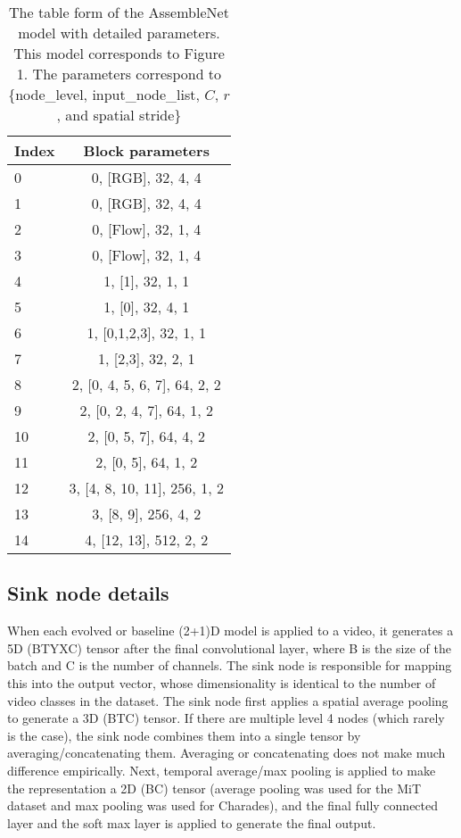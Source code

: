 \documentclass{article} \usepackage{iclr2020_conference,times}
\begin{document}
\begin{table}
    \centering
    \setlength\tabcolsep{5pt}
    \caption{The table form of the AssembleNet model with detailed parameters. This model corresponds to Figure 1. The parameters correspond to \{node\_level, input\_node\_list, $C$, $r$, and spatial stride\}}
    \label{tab:model}
    \begin{tabular}{|l|c|}
    \hline
      Index & Block parameters\\
    \hline
    0 & 0, [RGB], 32, 4, 4 \\ \hline
    1 & 0, [RGB], 32, 4, 4 \\ \hline
    2 & 0, [Flow], 32, 1, 4 \\ \hline
    3 & 0, [Flow], 32, 1, 4 \\ \hline
    4 & 1, [1], 32, 1, 1 \\ \hline
    5 & 1, [0], 32, 4, 1 \\ \hline
    6 & 1, [0,1,2,3], 32, 1, 1 \\ \hline
    7 & 1, [2,3], 32, 2, 1 \\ \hline
    8 & 2, [0, 4, 5, 6, 7], 64, 2, 2 \\ \hline
    9 & 2, [0, 2, 4, 7], 64, 1, 2 \\ \hline 
    10 & 2, [0, 5, 7], 64, 4, 2 \\ \hline
    11 & 2, [0, 5], 64, 1, 2 \\ \hline
    12 & 3, [4, 8, 10, 11], 256, 1, 2 \\ \hline
    13 & 3, [8, 9], 256, 4, 2 \\ \hline
    14 & 4, [12, 13], 512, 2, 2 \\
    \hline
    \end{tabular}
\end{table}


\subsection{Sink node details}

When each evolved or baseline (2+1)D model is applied to a video, it generates a 5D (BTYXC) tensor after the final convolutional layer, where B is the size of the batch and C is the number of channels. The sink node is responsible for mapping this into the output vector, whose dimensionality is identical to the number of video classes in the dataset. The sink node first applies a spatial average pooling to generate a 3D (BTC) tensor. If there are multiple level 4 nodes (which rarely is the case), the sink node combines them into a single tensor by averaging/concatenating them. Averaging or concatenating does not make much difference empirically. Next, temporal average/max pooling is applied to make the representation a 2D (BC) tensor (average pooling was used for the MiT dataset and max pooling was used for Charades), and the final fully connected layer and the soft max layer is applied to generate the final output.
\end{document}
